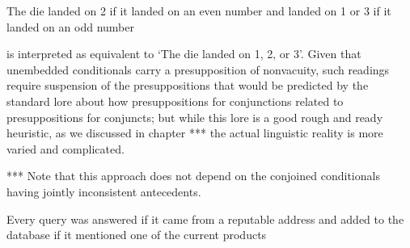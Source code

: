 \documentclass[If.tex]{subfiles}
\begin{document}
\begin{prop}
	\nitem
	The die landed on 2 if it landed on an even number and landed on 1 or 3 if it landed on an odd number
\end{prop}
is interpreted as equivalent to ‘The die landed on 1, 2, or 3’. Given that unembedded conditionals carry a presupposition of nonvacuity, such readings require suspension of the presuppositions that would be predicted by the standard lore about how presuppositions for conjunctions related to presuppositions for conjuncts; but while this lore is a good rough and ready heuristic, as we discussed in chapter *** the actual linguistic reality is more varied and complicated.  

*** 
Note that this approach does not depend on the conjoined conditionals having jointly inconsistent antecedents.
\begin{prop}
	\item	
	Every query was answered if it came from a reputable address and added to the database if it mentioned one of the current products
\end{prop}
\end{document}
